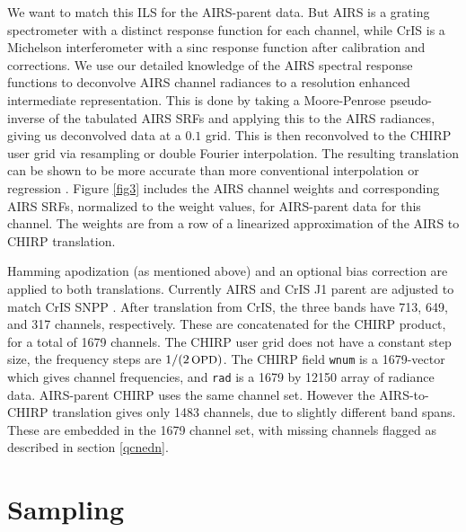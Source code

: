 \documentclass[12pt]{article}
\begin{document}
We want to match this ILS for the AIRS-parent data.  But AIRS is a
grating spectrometer with a distinct response function for each
channel, while CrIS is a Michelson interferometer with a sinc
response function after calibration and corrections.  We use our
detailed knowledge of the AIRS spectral response functions to
deconvolve AIRS channel radiances to a resolution enhanced
intermediate representation.  This is done by taking a Moore-Penrose
pseudo-inverse of the tabulated AIRS SRFs and applying this to the
AIRS radiances, giving us deconvolved data at a $0.1$ {\wn} grid.
This is then reconvolved to the CHIRP user grid via resampling or
double Fourier interpolation.  The resulting translation can be
shown to be more accurate than more conventional interpolation or
regression \cite{mott2018}.  Figure \ref{fig3} includes the AIRS
channel weights and corresponding AIRS SRFs, normalized to the weight
values, for AIRS-parent data for this channel.  The weights are from
a row of a linearized approximation of the AIRS to CHIRP translation.

Hamming apodization (as mentioned above) and an optional bias
correction are applied to both translations.  Currently AIRS and
CrIS J1 parent are adjusted to match CrIS SNPP \cite{strow2021a}.
After translation from CrIS, the three bands have 713, 649, and 317
channels, respectively.  These are concatenated for the CHIRP
product, for a total of 1679 channels.  The CHIRP user grid does not
have a constant step size, the frequency steps are $1/(2 \,\mbox{\small OPD})$.
The CHIRP field \texttt{wnum} is a 1679-vector which gives channel
frequencies, and \texttt{rad} is a 1679 by 12150 array of radiance
data.  AIRS-parent CHIRP uses the same channel set.  However the
AIRS-to-CHIRP translation gives only 1483 channels, due to slightly
different band spans.  These are embedded in the 1679 channel set,
with missing channels flagged as described in section \ref{qcnedn}.

\section{Sampling}
\label{sampling}
\end{document}
